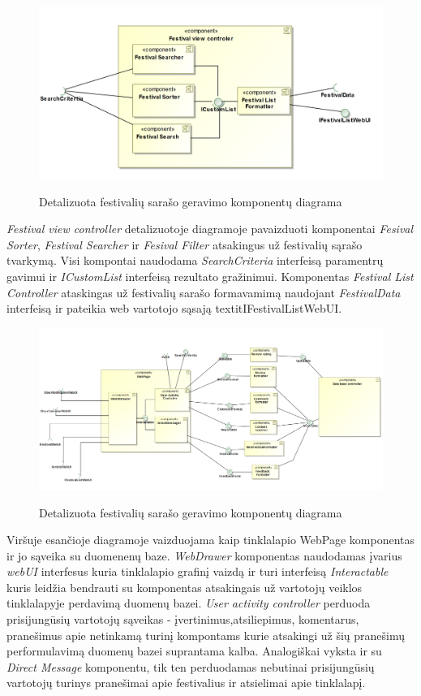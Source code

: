 ﻿\documentclass{VUMIFPSkursinis}
\begin{document}
 \begin{figure}[H]
\centering
    \includegraphics[scale=0.4]{img/PSI3/FestivalisViewController.PNG}
	\label{mantas:2}
	\caption{Detalizuota festivalių sarašo geravimo komponentų diagrama}
\end{figure}

\textit{Festival view controller} detalizuotoje diagramoje pavaizduoti komponentai \textit{Fesival Sorter}, \textit{Festival Searcher} ir \textit{Fesival Filter} atsakingus už festivalių sąrašo tvarkymą. Visi kompontai naudodama \textit{SearchCriteria} interfeisą paramentrų gavimui ir \textit{ICustomList} interfeisą rezultato gražinimui. Komponentas \textit{Festival List Controller} ataskingas už festivalių sarašo formavamimą naudojant \textit{FestivalData} interfeisą ir pateikia web vartotojo sąsają textit{IFestivalListWebUI}. 

 \begin{figure}[H]
\centering
    \includegraphics[scale=0.4]{img/PSI3/WebPage.PNG}
	\label{mantas:3}
	\caption{Detalizuota festivalių sarašo geravimo komponentų diagrama}
\end{figure}

Viršuje esančioje diagramoje vaizduojama kaip tinklalapio WebPage komponentas ir jo sąveika su duomenenų baze.
\textit{WebDrawer} komponentas naudodamas įvarius \textit{webUI} interfesus kuria tinklalapio grafinį vaizdą ir turi interfeisą \textit{Interactable} kuris
leidžia bendrauti su komponentas atsakingais už vartotojų veiklos tinklalapyje perdavimą duomenų bazei. \textit{User activity controller} 
perduoda prisijungūsių vartotojų sąveikas - įvertinimus,atsiliepimus, komentarus, pranešimus apie netinkamą turinį kompontams kurie 
atsakingi už šių pranešimų performulavimą duomenų bazei suprantama kalba. Analogiškai vyksta ir su \textit{Direct Message} komponentu, tik ten perduodamas nebutinai prisijungūsių vartotojų turinys pranešimai apie festivalius ir atsielimai apie tinklalapį. 
\end{document}
